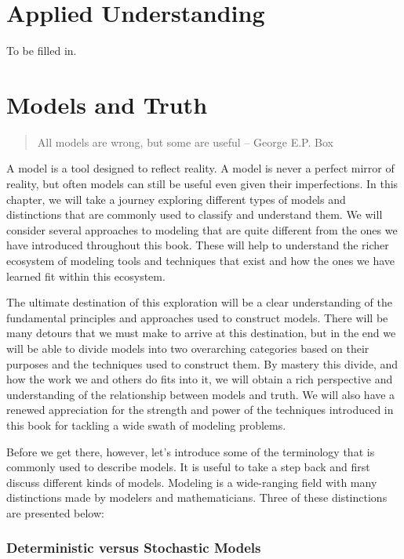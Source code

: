 \documentclass[]{memoir}
\begin{document}
\chapter{Applied Understanding}

To be filled in.

\chapter{Models and Truth}

\begin{quote}
All models are wrong, but some are useful -- George E.P. Box
\end{quote}

A model is a tool designed to reflect reality. A model is never a
perfect mirror of reality, but often models can still be useful even
given their imperfections. In this chapter, we will take a journey
exploring different types of models and distinctions that are commonly
used to classify and understand them. We will consider several
approaches to modeling that are quite different from the ones we have
introduced throughout this book. These will help to understand the
richer ecosystem of modeling tools and techniques that exist and how the
ones we have learned fit within this ecosystem.

The ultimate destination of this exploration will be a clear
understanding of the fundamental principles and approaches used to
construct models. There will be many detours that we must make to arrive
at this destination, but in the end we will be able to divide models
into two overarching categories based on their purposes and the
techniques used to construct them. By mastery this divide, and how the
work we and others do fits into it, we will obtain a rich perspective
and understanding of the relationship between models and truth. We will
also have a renewed appreciation for the strength and power of the
techniques introduced in this book for tackling a wide swath of modeling
problems.

Before we get there, however, let's introduce some of the terminology
that is commonly used to describe models. It is useful to take a step
back and first discuss different kinds of models. Modeling is a
wide-ranging field with many distinctions made by modelers and
mathematicians. Three of these distinctions are presented below:

\subsection{Deterministic versus Stochastic Models}
\end{document}
